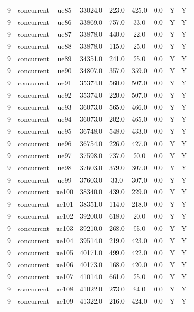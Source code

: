 \begin{table}[ht]
\begin{tabular}{|c|c|c|c|c|c|c|c|c|}
9 & concurrent & ue85 & 33024.0 & 223.0 & 425.0 & 0.0 & Y & Y \\
9 & concurrent & ue86 & 33869.0 & 757.0 & 33.0 & 0.0 & Y & Y \\
9 & concurrent & ue87 & 33878.0 & 440.0 & 22.0 & 0.0 & Y & Y \\
9 & concurrent & ue88 & 33878.0 & 115.0 & 25.0 & 0.0 & Y & Y \\
9 & concurrent & ue89 & 34351.0 & 241.0 & 25.0 & 0.0 & Y & Y \\
9 & concurrent & ue90 & 34807.0 & 357.0 & 359.0 & 0.0 & Y & Y \\
9 & concurrent & ue91 & 35374.0 & 560.0 & 507.0 & 0.0 & Y & Y \\
9 & concurrent & ue92 & 35374.0 & 220.0 & 507.0 & 0.0 & Y & Y \\
9 & concurrent & ue93 & 36073.0 & 565.0 & 466.0 & 0.0 & Y & Y \\
9 & concurrent & ue94 & 36073.0 & 202.0 & 465.0 & 0.0 & Y & Y \\
9 & concurrent & ue95 & 36748.0 & 548.0 & 433.0 & 0.0 & Y & Y \\
9 & concurrent & ue96 & 36754.0 & 226.0 & 427.0 & 0.0 & Y & Y \\
9 & concurrent & ue97 & 37598.0 & 737.0 & 20.0 & 0.0 & Y & Y \\
9 & concurrent & ue98 & 37603.0 & 379.0 & 307.0 & 0.0 & Y & Y \\
9 & concurrent & ue99 & 37603.0 & 33.0 & 307.0 & 0.0 & Y & Y \\
9 & concurrent & ue100 & 38340.0 & 439.0 & 229.0 & 0.0 & Y & Y \\
9 & concurrent & ue101 & 38351.0 & 114.0 & 218.0 & 0.0 & Y & Y \\
9 & concurrent & ue102 & 39200.0 & 618.0 & 20.0 & 0.0 & Y & Y \\
9 & concurrent & ue103 & 39210.0 & 268.0 & 95.0 & 0.0 & Y & Y \\
9 & concurrent & ue104 & 39514.0 & 219.0 & 423.0 & 0.0 & Y & Y \\
9 & concurrent & ue105 & 40171.0 & 499.0 & 422.0 & 0.0 & Y & Y \\
9 & concurrent & ue106 & 40173.0 & 168.0 & 420.0 & 0.0 & Y & Y \\
9 & concurrent & ue107 & 41014.0 & 661.0 & 25.0 & 0.0 & Y & Y \\
9 & concurrent & ue108 & 41022.0 & 273.0 & 94.0 & 0.0 & Y & Y \\
9 & concurrent & ue109 & 41322.0 & 216.0 & 424.0 & 0.0 & Y & Y \\

\end{tabular}
\end{table}

